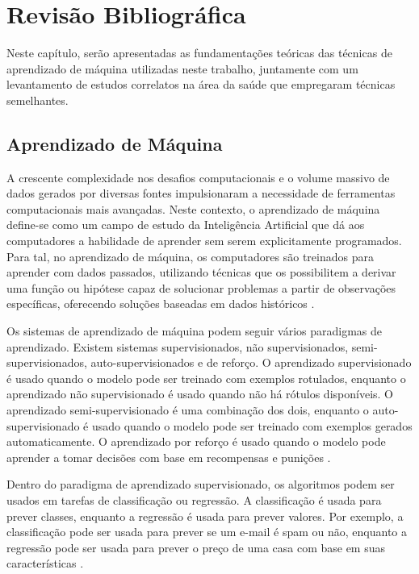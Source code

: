 
\chapter[Revisão Bibliográfica]{Revisão Bibliográfica}
\label{Revisão}
Neste capítulo, serão apresentadas as fundamentações teóricas das técnicas de aprendizado de máquina utilizadas neste trabalho, juntamente com um levantamento de estudos correlatos na área da saúde que empregaram técnicas semelhantes.

\section{Aprendizado de Máquina}
A crescente complexidade nos desafios computacionais e o volume massivo de dados gerados por diversas fontes impulsionaram a necessidade de ferramentas computacionais mais avançadas. Neste contexto, o aprendizado de máquina define-se como um campo de estudo da Inteligência Artificial que dá aos computadores a habilidade de aprender sem serem explicitamente programados. Para tal, no aprendizado de máquina, os computadores são treinados para aprender com dados passados, utilizando técnicas que os possibilitem a derivar uma função ou hipótese capaz de solucionar problemas a partir de observações específicas, oferecendo soluções baseadas em dados históricos \cite{faceli}.

Os sistemas de aprendizado de máquina podem seguir vários paradigmas de aprendizado. Existem sistemas supervisionados, não supervisionados, semi-supervisionados, auto-supervisionados e de reforço. O aprendizado supervisionado é usado quando o modelo pode ser treinado com exemplos rotulados, enquanto o aprendizado não supervisionado é usado quando não há rótulos disponíveis. O aprendizado semi-supervisionado é uma combinação dos dois, enquanto o auto-supervisionado é usado quando o modelo pode ser treinado com exemplos gerados automaticamente. O aprendizado por reforço é usado quando o modelo pode aprender a tomar decisões com base em recompensas e punições \cite{geron2022hands}.

Dentro do paradigma de aprendizado supervisionado, os algoritmos podem ser usados em tarefas de classificação ou regressão. A classificação é usada para prever classes, enquanto a regressão é usada para prever valores. Por exemplo, a classificação pode ser usada para prever se um e-mail é spam ou não, enquanto a regressão pode ser usada para prever o preço de uma casa com base em suas características \cite{geron2022hands}.

